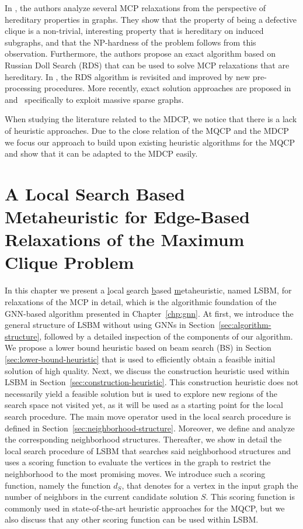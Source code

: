 \documentclass[draft,final]{vutinfth} %
\begin{document}
In \cite{Trukhanov2013}, the authors analyze several MCP relaxations from the perspective of hereditary properties in graphs. They show that the property of being a defective clique is a non-trivial, interesting property that is hereditary on induced subgraphs, and that the NP-hardness of the problem follows from this observation. Furthermore, the authors propose an exact algorithm based on Russian Doll Search (RDS) that can be used to solve MCP relaxations that are hereditary. In \cite{GSCHWIND2018131}, the RDS algorithm is revisited and improved by new pre-processing procedures. 
More recently, exact solution approaches are proposed in~\cite{chen2021computing} and~\cite{gao2022exact} specifically to exploit massive sparse graphs. 

When studying the literature related to the MDCP, we notice that there is a lack of heuristic approaches. Due to the close relation of the MQCP and the MDCP we focus our approach to build upon existing heuristic algorithms for the MQCP and show that it can be adapted to the MDCP easily. 

\chapter{A Local Search Based Metaheuristic for Edge-Based Relaxations of the Maximum Clique Problem}\label{chp:local-search-algorithm}

In this chapter we present a \underline{l}ocal \underline{s}earch \underline{b}ased \underline{m}etaheuristic, named LSBM, for relaxations of the MCP in detail, which is the algorithmic foundation of the GNN-based algorithm presented in Chapter~\ref{chp:gnn}. 
At first, we introduce the general structure of LSBM without using GNNs in Section~\ref{sec:algorithm-structure}, followed by a detailed inspection of the components of our algorithm. We propose a lower bound heuristic based on beam search (BS) in Section \ref{sec:lower-bound-heuristic} that is used to efficiently obtain a feasible initial solution of high quality. 
Next, we discuss the construction heuristic used within LSBM in Section~\ref{sec:construction-heuristic}. This construction heuristic does not necessarily yield a feasible solution but is used to explore new regions of the search space not visited yet, as it will be used as a starting point for the local search procedure. 
The main move operator used in the local search procedure is defined in Section~\ref{sec:neighborhood-structure}. Moreover, we define and analyze the corresponding neighborhood structures. 
Thereafter, we show in detail the local search procedure of LSBM that searches said neighborhood structures and uses a scoring function to evaluate the vertices in the graph to restrict the neighborhood to the most promising moves. We introduce such a scoring function, namely the function $d_S$, that denotes for a vertex in the input graph the number of neighbors in the current candidate solution $S$. This scoring function is commonly used in state-of-the-art heuristic approaches for the MQCP, but we also discuss that any other scoring function can be used within LSBM. 
\end{document}
